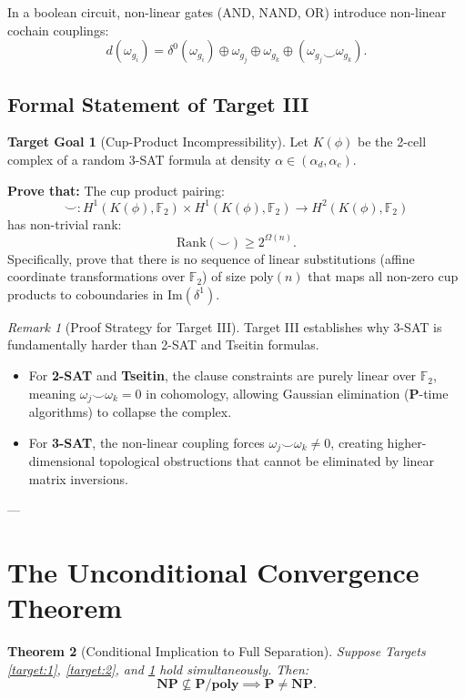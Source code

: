 \documentclass[11pt,a4paper]{article}
\theoremstyle{plain}
\newtheorem{theorem}{Theorem}[section]
\theoremstyle{definition}
\newtheorem{target}{Target Goal}[section]
\theoremstyle{remark}
\newtheorem{remark}[theorem]{Remark}
\newcommand{\Rank}{\mathrm{Rank}}
\newcommand{\Img}{\mathrm{Im}}
\begin{document}
In a boolean circuit, non-linear gates (AND, NAND, OR) introduce non-linear cochain couplings:
\[
d(\omega_{g_i}) = \delta^0(\omega_{g_i}) \oplus \omega_{g_j} \oplus \omega_{g_k} \oplus (\omega_{g_j} \smile \omega_{g_k}).
\]

\subsection{Formal Statement of Target III}

\begin{target}[Cup-Product Incompressibility]\label{target:3}
Let $K(\phi)$ be the 2-cell complex of a random 3-SAT formula at density $\alpha \in (\alpha_d, \alpha_c)$.

\textbf{Prove that:}
The cup product pairing:
\[
\smile: H^1(K(\phi), \mathbb{F}_2) \times H^1(K(\phi), \mathbb{F}_2) \longrightarrow H^2(K(\phi), \mathbb{F}_2)
\]
has non-trivial rank:
\[
\Rank(\smile) \ge 2^{\Omega(n)}.
\]
Specifically, prove that there is no sequence of linear substitutions (affine coordinate transformations over $\mathbb{F}_2$) of size $\mathrm{poly}(n)$ that maps all non-zero cup products to coboundaries in $\Img(\delta^1)$.
\end{target}

\begin{remark}[Proof Strategy for Target III]
Target III establishes why 3-SAT is fundamentally harder than 2-SAT and Tseitin formulas. 
\begin{itemize}
    \item For \textbf{2-SAT} and \textbf{Tseitin}, the clause constraints are purely linear over $\mathbb{F}_2$, meaning $\omega_j \smile \omega_k = 0$ in cohomology, allowing Gaussian elimination ($\mathbf{P}$-time algorithms) to collapse the complex.
    \item For \textbf{3-SAT}, the non-linear coupling forces $\omega_j \smile \omega_k \neq 0$, creating higher-dimensional topological obstructions that cannot be eliminated by linear matrix inversions.
\end{itemize}
\end{remark}

---

\section{The Unconditional Convergence Theorem}

\begin{theorem}[Conditional Implication to Full Separation]\label{thm:final_convergence}
Suppose Targets \ref{target:1}, \ref{target:2}, and \ref{target:3} hold simultaneously. Then:
\[
\mathbf{NP} \not\subseteq \mathbf{P/poly} \implies \mathbf{P} \neq \mathbf{NP}.
\]
\end{theorem}
\end{document}
